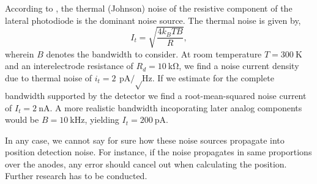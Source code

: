 According to \cite{Woltring75}, the thermal (Johnson) noise of the resistive component of the lateral photodiode is the dominant noise source.
The thermal noise is given by,
\begin{equation}
	I_t=\sqrt{\frac{4k_BTB}{R}},
\end{equation}
wherein $B$ denotes the bandwidth to consider.
At room temperature $T=\SI{300}{\kelvin}$ and an interelectrode resistance of $R_d=\SI{10}{\kilo\ohm}$, we find a noise current density due to thermal noise of $i_t=\SI{2}{\pico\ampere\per\sqrt\hertz}$.
If we estimate for the complete bandwidth supported by the detector we find a root-mean-squared noise current of $I_t=\SI{2}{\nano\ampere}$.
A more realistic bandwidth incoporating later analog components would be $B=\SI{10}{\kilo\hertz}$, yielding $I_t=\SI{200}{\pico\ampere}$.

In any case, we cannot say for sure how these noise sources propagate into position detection noise.
For instance, if the noise propagates in same proportions over the anodes, any error should cancel out when calculating the position.
Further research has to be conducted.
